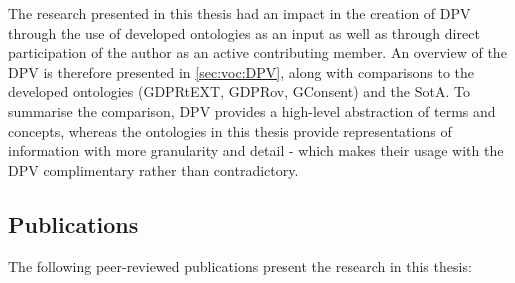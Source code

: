 The research presented in this thesis had an impact in the creation of DPV through the use of developed ontologies as an input as well as through direct participation of the author as an active contributing member.
An overview of the DPV is therefore presented in \autoref{sec:voc:DPV}, along with comparisons to the developed ontologies (GDPRtEXT, GDPRov, GConsent) and the SotA.
To summarise the comparison, DPV provides a high-level abstraction of terms and concepts, whereas the ontologies in this thesis provide representations of information with more granularity and detail - which makes their usage with the DPV complimentary rather than contradictory.

\subsection{Publications}\label{sec:intro:publications}
The following peer-reviewed publications present the research in this thesis:


